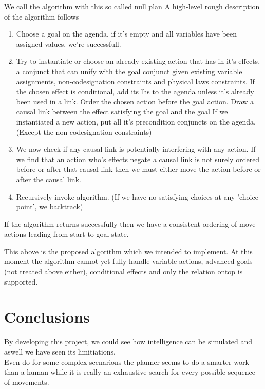 \documentclass[11pt]{article}
\begin{document}
We call the algorithm with this so called null plan
A high-level rough description of the algorithm follows
\begin{enumerate}
\item 
  Choose a goal on the agenda, if it's empty and all variables have been
  assigned values, we're successfull.
\item 
  Try to instantiate or choose an already existing action that has in it's
  effects, a conjunct that can unify with the goal conjunct given existing
  variable assignments, non-codesignation constraints and physical laws
  constraints.  If the chosen effect is conditional, add its lhs to the agenda
  unless it's already been used in a link.  Order the chosen action before the
  goal action.  Draw a causal link between the effect satisfying the goal and
  the goal If we instantiated a new action, put all it's precondition conjuncts
  on the agenda.  (Except the non codesignation constraints)  
\item
  We now check if any causal link is potentially interfering with any action.
  If we find that an action who's effects negate a causal link is not surely
  ordered before or after that causal link then we must either move the action
  before or after the causal link. 
\item
  Recursively invoke algorithm. (If we have no satisfying choices at any 
  'choice point', we backtrack)
\end{enumerate}

If the algorithm returns successfully then we have a consistent ordering of move
actions leading from start to goal state.

This above is the proposed algorithm which we intended to implement.  At this
moment the algorithm cannot yet fully handle variable actions, advanced goals
(not treated above either), conditional effects and only the relation ontop is
supported. 
    
\section{Conclusions}
By developing this project, we could see how intelligence can be simulated and 
aswell we have seen its limitiations.  \\

Even do for some complex scenarions the planner seems to do a smarter work 
than a human while it is really an exhaustive search for every possible sequence 
of movements.  \\
\end{document}
